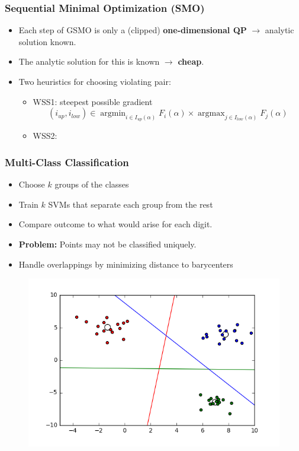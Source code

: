 \documentclass[12pt, compress]{beamer}
\newcommand{\titleC}{Sequential Minimal Optimization (SMO)}
\newcommand{\titleD}{Multi-Class Classification}
\DeclareMathOperator{\argmax}{argmax}
\DeclareMathOperator{\argmin}{argmin}
\begin{document}
\begin{frame}
\frametitle{\titleC}
\begin{itemize}
	\item Each step of GSMO is only a (clipped) \textbf{\alert{one-dimensional QP}} $\rightarrow$ analytic solution known.
	\item The analytic solution for this is known $\rightarrow$ \textbf{\alert{cheap}}.
	\item Two heuristics for choosing violating pair: \begin{itemize}
		\item WSS1: steepest possible gradient
		\[
		(i_{up},i_{low}) \in \argmin_{i \in I_{up}(\alpha)}F_i(\alpha) \times \argmax_{j \in I_{low}(\alpha)}F_j(\alpha)
		\]
		\item WSS2: 
		
	\end{itemize}
\end{itemize}
\end{frame}

\begin{frame}
  \frametitle{\titleD}
	\begin{itemize}
		\item Choose $k$ groups of the classes
		\item Train $k$ SVMs that separate each group from the rest
		\item Compare outcome to what would arise for each digit.
		\item \textbf{\alert{Problem:}} Points may not be classified uniquely.
		\item Handle overlappings by minimizing distance to barycenters
	\end{itemize}

	\begin{figure}[h]
		\includegraphics[width=.6\textwidth]{onevsall_examplegraphic}
	\end{figure}
\end{frame}
\end{document}

